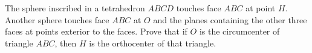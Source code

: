 The sphere inscribed in a tetrahedron $ABCD$ touches face $ABC$ at point $H$. Another sphere touches face $ABC$ at $O$ and the planes containing the other three faces at points exterior to the faces. Prove that if $O$ is the circumcenter of triangle $ABC$, then $H$ is the orthocenter of that triangle.